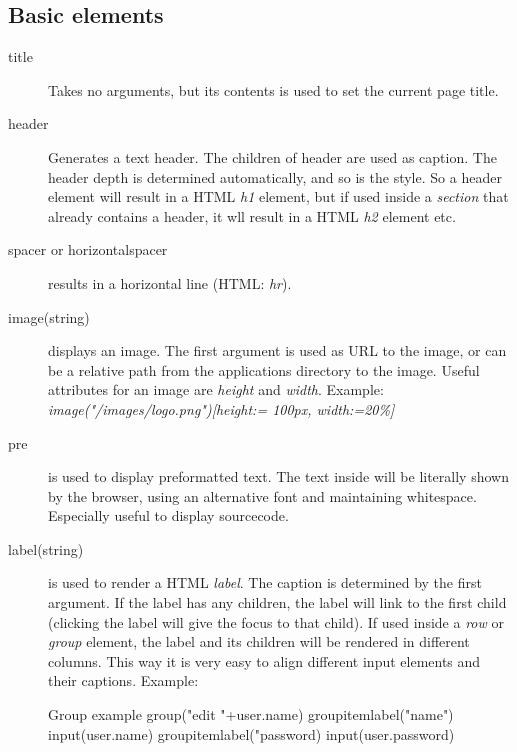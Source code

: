 \subsection{Basic elements}
\begin{description}
	\item[title{}] Takes no arguments, but its contents is used to set the current page title. 
	\item[header{}] Generates a text header. The children of header are used as caption. The header depth is determined automatically, and so is the style. So a header element will result in a HTML \emph{h1} element, but if used inside a \emph{section} that already contains a header, it wll result in a HTML \emph{h2} element etc. 
	\item[spacer or horizontalspacer] results in a horizontal line (HTML: \emph{hr}). 
	\item[image(string)] displays an image. The first argument is used as URL to the image, or can be a relative path from the applications directory to the image. Useful attributes for an image are \emph{height} and \emph{width}. Example: \emph{image("/images/logo.png")[height:= 100px, width:=20\%]}
	\item[pre{}] is used to display preformatted text. The text inside will be literally shown by the browser, using an alternative font and maintaining whitespace. Especially useful to display sourcecode. 
	\item[label(string){}] is used to render a HTML \emph{label}. The caption is determined by the first argument. If the label has any children, the label will link to the first child (clicking the label will give the focus to that child). If used inside a \emph{row} or \emph{group} element, the label and its children will be rendered in different columns. This way it is very easy to align different input elements and their captions. Example:
\begin{webdsl}{Group example}
group("edit "+user.name) {
	groupitem{label("name") 		{ input(user.name)} }
	groupitem{label("password) 	{ input(user.password) } }
}
\end{webdsl}
\end{description}


